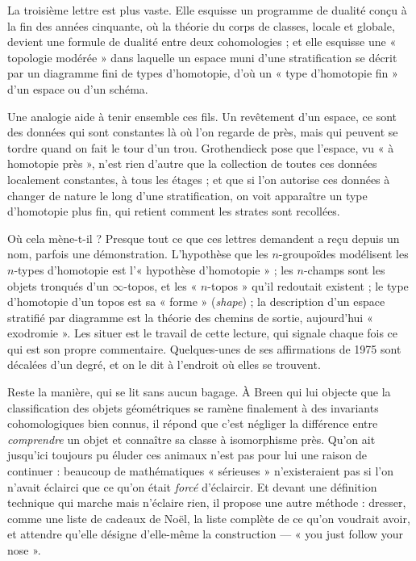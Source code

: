 \documentclass[11pt,a4paper]{article}
\begin{document}
\begin{resume}
La troisième lettre est plus vaste. Elle esquisse un programme de dualité
conçu à la fin des années cinquante, où la théorie du corps de classes,
locale et globale, devient une formule de dualité entre deux cohomologies ;
et elle esquisse une « topologie modérée » dans laquelle un espace muni d'une
stratification se décrit par un diagramme fini de types d'homotopie, d'où
un « type d'homotopie fin » d'un espace ou d'un schéma.

Une analogie aide à tenir ensemble ces fils. Un revêtement d'un espace, ce
sont des données qui sont constantes là où l'on regarde de près, mais qui
peuvent se tordre quand on fait le tour d'un trou. Grothendieck pose que
l'espace, vu « à homotopie près », n'est rien d'autre que la collection de
toutes ces données localement constantes, à tous les étages ; et que si l'on
autorise ces données à changer de nature le long d'une stratification, on
voit apparaître un type d'homotopie plus fin, qui retient comment les
strates sont recollées.

Où cela mène-t-il ? Presque tout ce que ces lettres demandent a reçu depuis
un nom, parfois une démonstration. L'hypothèse que les $n$-groupoïdes
modélisent les $n$-types d'homotopie est l'« hypothèse d'homotopie » ; les
$n$-champs sont les objets tronqués d'un $\infty$-topos, et les
« $n$-topos » qu'il redoutait existent ; le type d'homotopie d'un topos est
sa « forme » (\emph{shape}) ; la description d'un espace stratifié par
diagramme est la théorie des chemins de sortie, aujourd'hui
« exodromie ». Les situer est le travail de cette lecture, qui signale
chaque fois ce qui est son propre commentaire. Quelques-unes de ses
affirmations de 1975 sont décalées d'un degré, et on le dit à l'endroit où
elles se trouvent.

Reste la manière, qui se lit sans aucun bagage. À Breen qui lui objecte que
la classification des objets géométriques se ramène finalement à des
invariants cohomologiques bien connus, il répond que c'est négliger la
différence entre \emph{comprendre} un objet et connaître sa classe à
isomorphisme près. Qu'on ait jusqu'ici toujours pu éluder ces animaux
n'est pas pour lui une raison de continuer : beaucoup de mathématiques
« sérieuses » n'existeraient pas si l'on n'avait éclairci que ce qu'on était
\emph{forcé} d'éclaircir. Et devant une définition technique qui marche mais
n'éclaire rien, il propose une autre méthode : dresser, comme une liste de
cadeaux de Noël, la liste complète de ce qu'on voudrait avoir, et attendre
qu'elle désigne d'elle-même la construction --- « you just follow your nose ».

\end{resume}
\end{document}
